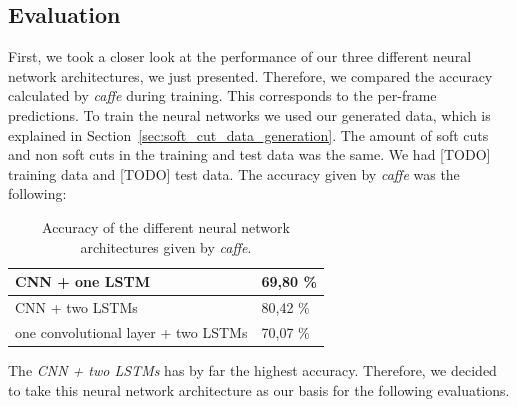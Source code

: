 \subsection{Evaluation}
\label{sec:soft_cut_evaluation}

First, we took a closer look at the performance of our three different neural network architectures, we just presented.
Therefore, we compared the accuracy calculated by \textit{caffe} during training.
This corresponds to the per-frame predictions.
To train the neural networks we used our generated data, which is explained in Section~\ref{sec:soft_cut_data_generation}.
The amount of soft cuts and non soft cuts in the training and test data was the same.
We had [TODO] training data and [TODO] test data.
The accuracy given by \textit{caffe} was the following:
\begin{table}[ht]
	\centering
	\begin{tabular}{l|l}
	CNN + one LSTM                      & 69,80 \% \\ \hline
	CNN + two LSTMs                     & 80,42 \% \\ \hline
	one convolutional layer + two LSTMs & 70,07 \% \\
	\end{tabular}
	\caption{Accuracy of the different neural network architectures given by \textit{caffe}.}
	\label{tab:caffe_accurary}
\end{table}
The \textit{CNN + two LSTMs} has by far the highest accuracy.
Therefore, we decided to take this neural network architecture as our basis for the following evaluations.

